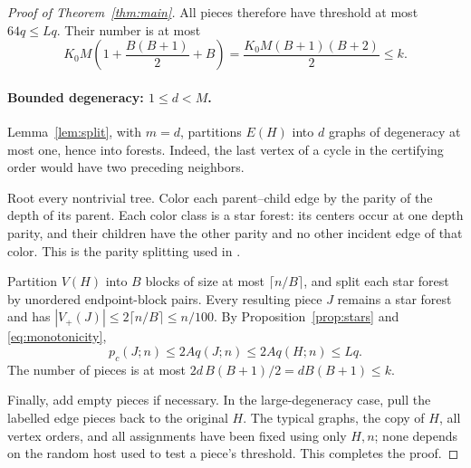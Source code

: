 \begin{proof}[Proof of Theorem~\ref{thm:main}]
All pieces therefore have threshold at most $64q\leq Lq$.
Their number is at most
\[
 K_0M\left(1+\frac{B(B+1)}2+B\right)
 =\frac{K_0M(B+1)(B+2)}2\leq k.
\]

\paragraph{Bounded degeneracy: $1\leq d<M$.}
Lemma~\ref{lem:split}, with $m=d$, partitions $E(H)$ into
$d$ graphs of degeneracy at most one, hence into forests.
Indeed, the last vertex of a cycle in the certifying order
would have two preceding neighbors.

Root every nontrivial tree. Color each parent--child edge by
the parity of the depth of its parent. Each color class is a
star forest: its centers occur at one depth parity, and their
children have the other parity and no other incident edge of
that color. This is the parity splitting used in
\cite[Claim~6.2]{AHPT26}.

Partition $V(H)$ into $B$ blocks of size at most
$\lceil n/B\rceil$, and split each star forest by unordered
endpoint-block pairs. Every resulting piece $J$ remains a star
forest and has
$|V_+(J)|\leq2\lceil n/B\rceil\leq n/100$.
By Proposition~\ref{prop:stars} and \eqref{eq:monotonicity},
\[
 p_c(J;n)\leq2Aq(J;n)\leq2Aq(H;n)\leq Lq.
\]
The number of pieces is at most
$2d\,B(B+1)/2=dB(B+1)\leq k$.

Finally, add empty pieces if necessary. In the large-degeneracy
case, pull the labelled edge pieces back to the original $H$.
The typical graphs, the copy of $H$, all vertex orders, and
all assignments have been fixed using only $H,n$; none depends
on the random host used to test a piece's threshold. This
completes the proof.
\end{proof}




